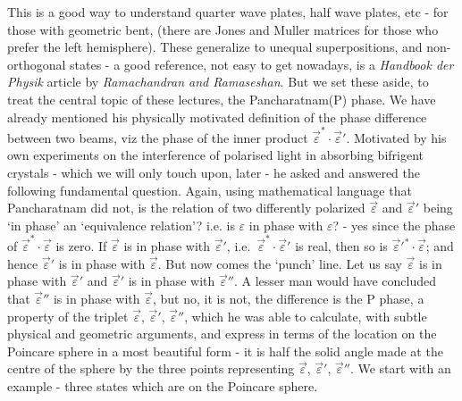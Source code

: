 This is a good way to understand quarter wave plates, half wave plates,
etc - for those with geometric bent, (there are Jones and Muller matrices for
those who prefer the left hemisphere). These generalize to unequal superpositions,
and non-orthogonal states - a good reference, not easy to get nowadays, is a
\textit{Handbook der Physik} article by \textit{Ramachandran and Ramaseshan}. But we set
these aside, to treat the central topic of these lectures, the Pancharatnam(P)
phase. We have already mentioned his physically motivated definition of the
phase difference between two beams, viz the phase of the inner product $\overrightarrow{\varepsilon}^{\ast} \cdot \overrightarrow{\varepsilon}'$. 
Motivated by his own experiments on the interference of polarised light in absorbing bifrigent crystals - which we will only touch upon, later - he asked and
answered the following fundamental question. Again, using mathematical language that Pancharatnam did not, is the relation of two differently polarized
$\overrightarrow{\varepsilon}$ and $\overrightarrow{\varepsilon}'$ being `in phase' an `equivalence relation'? i.e. is $\varepsilon$ in phase
with $\varepsilon$? - yes since the phase of $\overrightarrow{\varepsilon}^{\ast} \cdot \overrightarrow{\varepsilon}$ is zero. 
If $\overrightarrow{\varepsilon}$ is in phase with $\overrightarrow{\varepsilon}'$, 
i.e.\ $\overrightarrow{\varepsilon}^{\ast} \cdot \overrightarrow{\varepsilon}'$ is real, 
then so is $\overrightarrow{\varepsilon}'^{\ast} \cdot \overrightarrow{\varepsilon}$; 
and hence $\overrightarrow{\varepsilon}'$ is in phase with $\overrightarrow{\varepsilon}$. 
But now comes the `punch' line. Let us say $\overrightarrow{\varepsilon}$ is in phase 
with $\overrightarrow{\varepsilon}'$ and $\overrightarrow{\varepsilon}'$ is in phase with $\overrightarrow{\varepsilon}''$. 
A lesser man would have concluded that $\overrightarrow{\varepsilon}''$ is in phase with $\overrightarrow{\varepsilon}$, 
but no, it is not, the difference is the P phase, a property of the triplet 
$\overrightarrow{\varepsilon}$, $\overrightarrow{\varepsilon}'$, $\overrightarrow{\varepsilon}''$, which he 
was able to calculate, with subtle physical and geometric arguments, and express in
terms of the location on the Poincare sphere in a most beautiful form - it is half
the solid angle made at the centre of the sphere by the three points representing
$\overrightarrow{\varepsilon}$, $\overrightarrow{\varepsilon}'$, $\overrightarrow{\varepsilon}''$. We start with an example - three states which are on the Poincare sphere.
\bigskip

